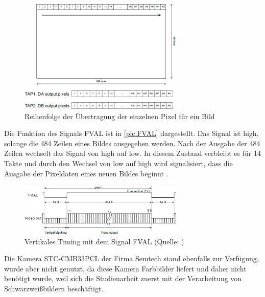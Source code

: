 \documentclass[ngerman,12pt]{article} %
\begin{document}
{\begin{figure} [h!tb]
	\begin{center}
	\includegraphics[width=0.7\textwidth]{LVAL_Pixel_Order_neu}
	\caption[Reihenfolge der Übertragung der einzelnen Pixel für ein Bild]{\label{pic:LVAL_Pixel_Order}Reihenfolge der Übertragung der einzelnen Pixel für ein Bild \cite{Sentech}}
	\end{center}
\end{figure}

Die Funktion des Signals FVAL ist in \autoref{pic:FVAL} dargestellt. Das Signal ist high, solange die 484 Zeilen eines Bildes ausgegeben werden. Nach der Ausgabe der 484 Zeilen wechselt das Signal von high auf low. In diesem Zustand verbleibt es für 14 Takte und durch den Wechsel von low auf high wird signalisiert, dass die Ausgabe der Pixeldaten eines neuen Bildes beginnt \cite{Sentech}.\newline

\begin{figure} [h!tb]
	\begin{center}
	\includegraphics[width=0.7\textwidth]{FVAL_neu}
	\caption[ertikales Timing mit dem Signal FVAL]{\label{pic:FVAL}Vertikales Timing mit dem Signal FVAL (Quelle: \cite{Sentech})}
	\end{center}
\end{figure}

Die Kamera STC-CMB33PCL der Firma Semtech stand ebenfalls zur Verfügung, wurde aber nicht genutzt, da diese Kamera Farbbilder liefert und daher nicht benötigt wurde, weil sich die Studienarbeit zuerst mit der Verarbeitung von Schwarzweißbildern beschäftigt.\newline



}
\end{document}
